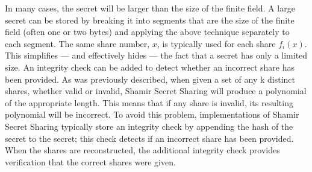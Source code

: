 In many cases, the secret will be larger than the size of the finite field.  A
large secret can be stored by breaking it into segments that are the size of
the finite field (often one or two bytes) and applying the above technique
separately to each segment.  The same share number, $x$, is typically used for
each share $f_i(x)$.  This simplifies --- and effectively hides --- the fact that a
secret has only a limited size.  An integrity check can be added to detect whether
an incorrect share has been provided.  As was previously described, when given a set
of any k distinct shares, whether valid or invalid, Shamir Secret Sharing will
produce a polynomial of the appropriate length. This means that if any share is
invalid, its resulting polynomial will be incorrect. To avoid this problem,
implementations of Shamir Secret Sharing typically store an integrity check by
appending the hash of the secret to the secret; this check detects if an
incorrect share has been provided.  When the shares are reconstructed, the
additional integrity check provides verification that the correct shares were
given.

